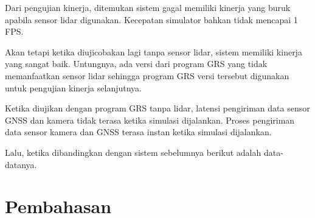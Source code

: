 Dari pengujian kinerja, ditemukan sistem gagal memiliki kinerja yang buruk
apabila sensor lidar digunakan. Kecepatan simulator bahkan tidak mencapai 1 FPS.

Akan tetapi ketika diujicobakan lagi tanpa sensor lidar, sistem memiliki kinerja
yang sangat baik. Untungnya, ada versi dari program GRS yang tidak memanfaatkan
sensor lidar sehingga program GRS versi tersebut digunakan untuk pengujian
kinerja selanjutnya.

Ketika diujikan dengan program GRS tanpa lidar, latensi pengiriman data sensor
GNSS dan kamera tidak terasa ketika simulasi dijalankan. Proses pengiriman data
sensor kamera dan GNSS terasa instan ketika simulasi dijalankan.

Lalu, ketika dibandingkan dengan sistem sebelumnya berikut adalah data-datanya.

\section{Pembahasan}
\blindtext
